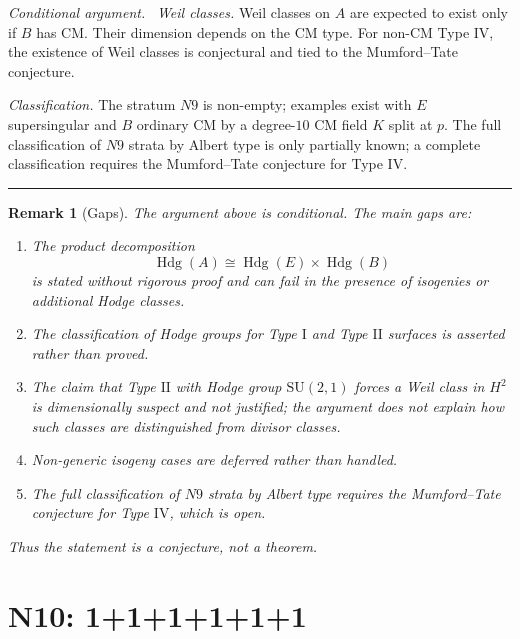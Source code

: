 \documentclass{article}
\newtheorem{remark}{Remark}
\newenvironment{proof}[1][Proof]{\par\noindent\textit{#1.}\ }{\hfill\rule{1.2ex}{1.2ex}\par}
\begin{document}
\begin{proof}[Conditional argument]
\emph{Weil classes.} Weil classes on \(A\) are expected to exist only if \(B\) has CM. Their dimension depends on the CM type. For non-CM Type \(\mathrm{IV}\), the existence of Weil classes is conjectural and tied to the Mumford--Tate conjecture.

\emph{Classification.} The stratum \(N9\) is non-empty; examples exist with \(E\) supersingular and \(B\) ordinary CM by a degree-\(10\) CM field \(K\) split at \(p\). The full classification of \(N9\) strata by Albert type is only partially known; a complete classification requires the Mumford--Tate conjecture for Type \(\mathrm{IV}\).
\end{proof}

\begin{remark}[Gaps]
The argument above is conditional. The main gaps are:
\begin{enumerate}
\item The product decomposition
\[
\operatorname{Hdg}(A)\cong \operatorname{Hdg}(E)\times \operatorname{Hdg}(B)
\]
is stated without rigorous proof and can fail in the presence of isogenies or additional Hodge classes.
\item The classification of Hodge groups for Type \(\mathrm{I}\) and Type \(\mathrm{II}\) surfaces is asserted rather than proved.
\item The claim that Type \(\mathrm{II}\) with Hodge group \(\mathrm{SU}(2,1)\) forces a Weil class in \(H^2\) is dimensionally suspect and not justified; the argument does not explain how such classes are distinguished from divisor classes.
\item Non-generic isogeny cases are deferred rather than handled.
\item The full classification of \(N9\) strata by Albert type requires the Mumford--Tate conjecture for Type \(\mathrm{IV}\), which is open.
\end{enumerate}
Thus the statement is a conjecture, not a theorem.
\end{remark}

\section{N10: 1+1+1+1+1+1}
\end{document}
